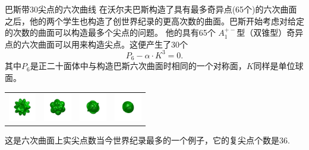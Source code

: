 ﻿\begin{surferPage}[六次曲线(30 尖点)]{巴斯带30尖点的六次曲线}
在沃尔夫巴斯构造了具有最多奇异点(65个)的六次曲面之后，他的两个学生也构造了创世界纪录的更高次数的曲面。巴斯开始考虑对给定的次数的曲面可以构造最多个尖点的问题。
他的具有65个 $A_1^{+-}$型（双锥型）奇异点的六次曲面可以用来构造尖点。这便产生了30个\[P_6 - \alpha \cdot K^3=0.\]其中$P_6$是正二十面体中与构造巴斯六次曲面时相同的一个对称面，$K$同样是单位球面。

    \vspace*{-0.4em}
    \begin{center}
      \begin{tabular}{c@{\ }c@{\ }c@{\ }c}
        \includegraphics[height=1.2cm]{./../../common/images/barthsextic_30A2}
        &
        \includegraphics[height=1.2cm]{./../../common/images/barthsextic_30A2_3}
        &
        \includegraphics[height=1.2cm]{./../../common/images/barthsextic_30A2_5}
        &
        \includegraphics[height=1.2cm]{./../../common/images/barthsextic_30A2_6}
      \end{tabular}
    \end{center}    
    \vspace*{-0.3em}

这是六次曲面上实尖点数当今世界纪录最多的一个例子，它的复尖点个数是36.
\end{surferPage}
